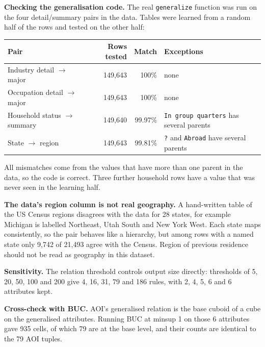 \documentclass[10pt]{article}
\begin{document}
\textbf{Checking the generalisation code.} The real \texttt{generalize} function was run on the four detail/summary pairs in the data. Tables were learned from a random half of the rows and tested on the other half:
\begin{center}\small
\begin{tabular}{lrrl}
\toprule
Pair & Rows tested & Match & Exceptions \\
\midrule
Industry detail $\to$ major & 149,643 & 100\% & none \\
Occupation detail $\to$ major & 149,643 & 100\% & none \\
Household status $\to$ summary & 149,640 & 99.97\% & \texttt{In group quarters} has several parents \\
State $\to$ region & 149,643 & 99.81\% & \texttt{?} and \texttt{Abroad} have several parents \\
\bottomrule
\end{tabular}
\end{center}
All mismatches come from the values that have more than one parent in the data, so the code is correct. Three further household rows have a value that was never seen in the learning half.

\textbf{The data's region column is not real geography.} A hand-written table of the US Census regions disagrees with the data for 28 states, for example Michigan is labelled Northeast, Utah South and New York West. Each state maps consistently, so the pair behaves like a hierarchy, but among rows with a named state only 9,742 of 21,493 agree with the Census. Region of previous residence should not be read as geography in this dataset.

\textbf{Sensitivity.} The relation threshold controls output size directly: thresholds of 5, 20, 50, 100 and 200 give 4, 16, 31, 79 and 186 rules, with 2, 4, 5, 6 and 6 attributes kept.

\textbf{Cross-check with BUC.} AOI's generalised relation is the base cuboid of a cube on the generalised attributes. Running BUC at minsup 1 on those 6 attributes gave 935 cells, of which 79 are at the base level, and their counts are identical to the 79 AOI tuples.
\end{document}
